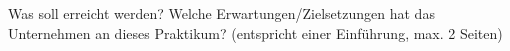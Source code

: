 \documentclass[crop=false]{standalone}
\begin{document}
Was soll erreicht werden? 
Welche Erwartungen/Zielsetzungen hat das Unternehmen an dieses Praktikum? 
(entspricht einer Einführung, max. 2 Seiten)
\end{document}
